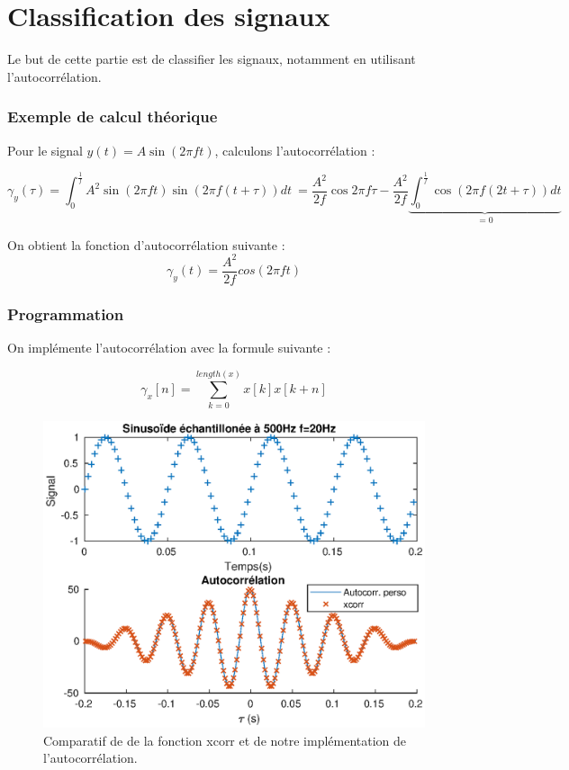\documentclass[french]{article}
\begin{document}
\FloatBarrier
\newpage
\part{ Classification des signaux}

Le but de cette partie est de classifier les signaux, notamment en utilisant l'autocorrélation.

\section{ Exemple de calcul théorique}

Pour le signal $y(t) = A \sin(2 \pi f t)$, calculons l'autocorrélation :

\[
\gamma_y(\tau) = \int_0^{\frac{1}{f}} A^2 \sin(2\pi f t) \sin(2 \pi f (t+\tau)) dt \
= \frac{A^2}{2f} \cos 2\pi f \tau - \frac{A^2}{2f}\underbrace{\int_0^{\frac{1}{f}} \cos (2 \pi f (2t + \tau)) dt}_{=0}
\]

On obtient la fonction d'autocorrélation suivante :
\[
\gamma_y (t) = \frac{A^2} {2f} cos(2 \pi f t)
\]

\section{ Programmation}

On implémente l'autocorrélation avec la formule suivante :

\[
\gamma_x [n] = \sum_{k = 0} ^{length (x)} x[k]x[k+n]
\]

\begin{figure}[h!]
	\centering
	\includegraphics{images/autocorr.eps}
	\caption{Comparatif de de la fonction xcorr et de notre implémentation de l'autocorrélation.}
	\label{autocorr}
\end{figure}
\end{document}
